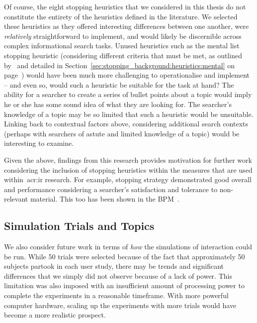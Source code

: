 Of course, the eight stopping heuristics that we considered in this thesis do not constitute the entirety of the heuristics defined in the literature. We selected these heuristics as they offered interesting differences between one another, were \emph{relatively} straightforward to implement, and would likely be discernible across complex informational search tasks. Unused heuristics such as the mental list stopping heuristic (considering different criteria that must be met, as outlined by~\cite{nickles1995judgment} and detailed in Section~\ref{sec:stopping_background:heuristics:mental} on page~\pageref{sec:stopping_background:heuristics:mental}) would have been much more challenging to operationalise and implement -- and even so, would such a heuristic be suitable for the task at hand? The ability for a searcher to create a series of bullet points about a topic would imply he or she has some sound idea of what they are looking for. The searcher's knowledge of a topic may be so limited that such a heuristic would be unsuitable. Linking back to contextual factors above, considering additional search contexts (perhaps with searchers of astute and limited knowledge of a topic) would be interesting to examine.

Given the above, findings from this research provides motivation for further work considering the inclusion of stopping heuristics within the measures that are used within~\gls{acr:ir} research. For example, stopping strategy  demonstrated good overall and performance considering a searcher's satisfaction and tolerance to non-relevant material. This too has been shown in the BPM~\citep{zhang2017bejewled}.

\subsection{Simulation Trials and Topics}\label{sec:conclusions:future:running}
We also consider future work in terms of \emph{how} the simulations of interaction could be run. While 50 trials were selected because of the fact that approximately 50 subjects partook in each user study, there may be trends and significant differences that we simply did not observe because of a lack of power. This limitation was also imposed with an insufficient amount of processing power to complete the experiments in a reasonable timeframe. With more powerful computer hardware, scaling up the experiments with more trials would have become a more realistic prospect.

